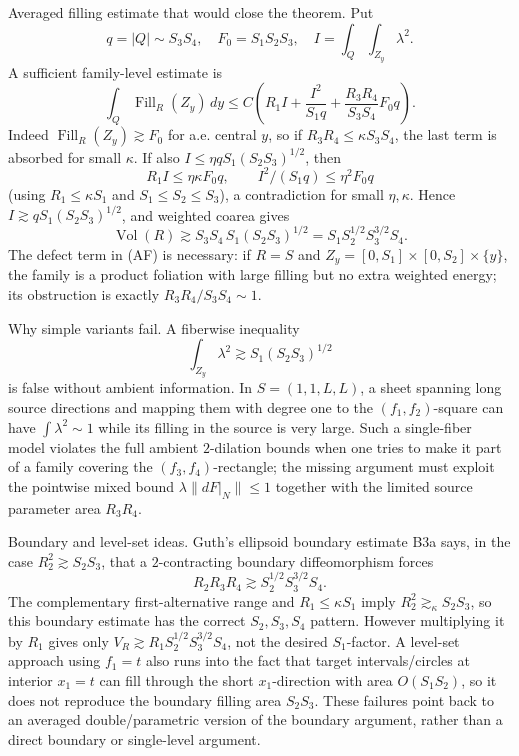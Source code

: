 \documentclass[12pt]{article}
\newcommand{\Vol}{\operatorname{Vol}}
\newcommand{\Fill}{\operatorname{Fill}}
\begin{document}
Averaged filling estimate that would close the theorem.  Put
\[
q=|Q|\sim S_3S_4,\quad F_0=S_1S_2S_3,\quad
I=\int_Q\int_{Z_y}\lambda^2 .
\]
A sufficient family-level estimate is
\[
\int_Q \Fill_R(Z_y)\,dy
\le C\left(R_1I+\frac{I^2}{S_1q}
+\frac{R_3R_4}{S_3S_4}F_0q\right). \tag{AF}
\]
Indeed \(\Fill_R(Z_y)\gtrsim F_0\) for a.e. central \(y\), so if
\(R_3R_4\le\kappa S_3S_4\), the last term is absorbed for small \(\kappa\).  If also
\(I\le\eta qS_1(S_2S_3)^{1/2}\), then
\[
R_1I\le \eta\kappa F_0q,\qquad I^2/(S_1q)\le\eta^2F_0q
\]
(using \(R_1\le\kappa S_1\) and \(S_1\le S_2\le S_3\)), a contradiction for small
\(\eta,\kappa\).  Hence \(I\gtrsim qS_1(S_2S_3)^{1/2}\), and weighted coarea gives
\[
\Vol(R)\gtrsim S_3S_4\,S_1(S_2S_3)^{1/2}
=S_1S_2^{1/2}S_3^{3/2}S_4.
\]
The defect term in (AF) is necessary: if \(R=S\) and \(Z_y=[0,S_1]\times[0,S_2]\times\{y\}\), the family is a product foliation with
large filling but no extra weighted energy; its obstruction is exactly
\(R_3R_4/S_3S_4\sim1\).

Why simple variants fail.  A fiberwise inequality
\[
\int_{Z_y}\lambda^2\gtrsim S_1(S_2S_3)^{1/2}
\]
is false without ambient information.  In \(S=(1,1,L,L)\), a sheet spanning long
source directions and mapping them with degree one to the \((f_1,f_2)\)-square can
have \(\int\lambda^2\sim1\) while its filling in the source is very large.  Such a
single-fiber model violates the full ambient \(2\)-dilation bounds when one tries to
make it part of a family covering the \((f_3,f_4)\)-rectangle; the missing argument
must exploit the pointwise mixed bound \(\lambda\|dF|_N\|\le1\) together with the
limited source parameter area \(R_3R_4\).

Boundary and level-set ideas.  Guth's ellipsoid boundary estimate B3a says, in the
case \(R_2^2\gtrsim S_2S_3\), that a \(2\)-contracting boundary diffeomorphism
forces
\[
R_2R_3R_4\gtrsim S_2^{1/2}S_3^{3/2}S_4.
\]
The complementary first-alternative range and \(R_1\le\kappa S_1\) imply
\(R_2^2\gtrsim_\kappa S_2S_3\), so this boundary estimate has the correct
\(S_2,S_3,S_4\) pattern.  However multiplying it by \(R_1\) gives only
\(V_R\gtrsim R_1S_2^{1/2}S_3^{3/2}S_4\), not the desired \(S_1\)-factor.  A level-set
approach using \(f_1=t\) also runs into the fact that target intervals/circles at
interior \(x_1=t\) can fill through the short \(x_1\)-direction with area \(O(S_1S_2)\),
so it does not reproduce the boundary filling area \(S_2S_3\).  These failures point
back to an averaged double/parametric version of the boundary argument, rather than
a direct boundary or single-level argument.
\end{document}
